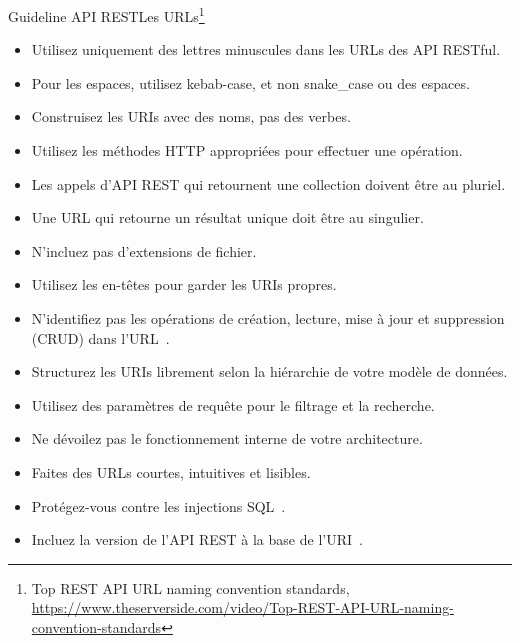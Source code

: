 \documentclass{beamer}
\begin{document}
    \begin{frame}{Guideline API REST}{Les URLs\footnote{Top REST API URL naming convention standards, \url{https://www.theserverside.com/video/Top-REST-API-URL-naming-convention-standards}}}
        \begin{tiny}
            \begin{itemize}
                \item Utilisez uniquement des lettres minuscules dans les URLs des API RESTful.
                \item Pour les espaces, utilisez kebab-case, et non snake\_case ou des espaces.
                \item Construisez les URIs avec des noms, pas des verbes.
                \item Utilisez les méthodes HTTP appropriées pour effectuer une opération.
                \item Les appels d'API REST qui retournent une collection doivent être au pluriel.
                \item Une URL qui retourne un résultat unique doit être au singulier.
                \item N'incluez pas d'extensions de fichier.
                \item Utilisez les en-têtes pour garder les URIs propres.
                \item N'identifiez pas les opérations de création, lecture, mise à jour et suppression (CRUD) dans l'URL~.
                \item Structurez les URIs librement selon la hiérarchie de votre modèle de données.
                \item Utilisez des paramètres de requête pour le filtrage et la recherche.
                \item Ne dévoilez pas le fonctionnement interne de votre architecture.
                \item Faites des URLs courtes, intuitives et lisibles.
                \item Protégez-vous contre les injections SQL~.
                \item Incluez la version de l'API REST à la base de l'URI~.
            \end{itemize}
        \end{tiny}
    \end{frame}
\end{document}
